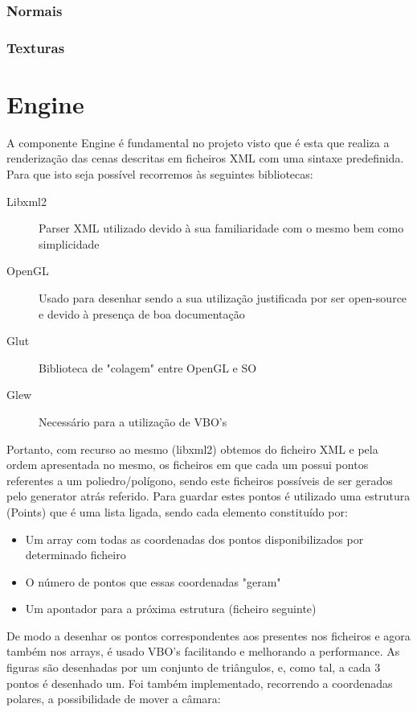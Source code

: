 \documentclass{article}
\begin{document}
\subsubsection{Normais}

\subsubsection{Texturas}

\section{Engine}
A componente Engine é fundamental no projeto visto que é esta que realiza a renderização das cenas descritas em ficheiros XML com uma sintaxe predefinida.
Para que isto seja possível recorremos às seguintes bibliotecas:
\begin{description}
    \item [Libxml2] Parser XML utilizado devido à sua familiaridade com o mesmo bem como simplicidade
    \item [OpenGL] Usado para desenhar sendo a sua utilização justificada por ser open-source e devido à presença de boa documentação
    \item [Glut] Biblioteca de "colagem" entre OpenGL e SO
    \item [Glew] Necessário para a utilização de VBO's
\end{description}
Portanto, com recurso ao mesmo (libxml2) obtemos do ficheiro XML e pela ordem apresentada no mesmo, os ficheiros em que cada um possui pontos referentes a um poliedro/polígono, sendo este ficheiros possíveis de ser gerados pelo generator atrás referido. 
Para guardar estes pontos é utilizado uma estrutura (Points) que é uma lista ligada, sendo cada elemento constituído por:
\begin{itemize}
    \item Um array com todas as coordenadas dos pontos disponibilizados por determinado ficheiro
    \item O número de pontos que essas coordenadas "geram"
    \item Um apontador para a próxima estrutura (ficheiro seguinte)
\end{itemize}
De modo a desenhar os pontos correspondentes aos presentes nos ficheiros e agora também nos arrays, é usado VBO's facilitando e melhorando a performance. As figuras são desenhadas por um conjunto de triângulos, e, como tal, a cada 3 pontos é desenhado um. 
Foi também implementado, recorrendo a coordenadas polares, a possibilidade de mover a câmara:
\end{document}
